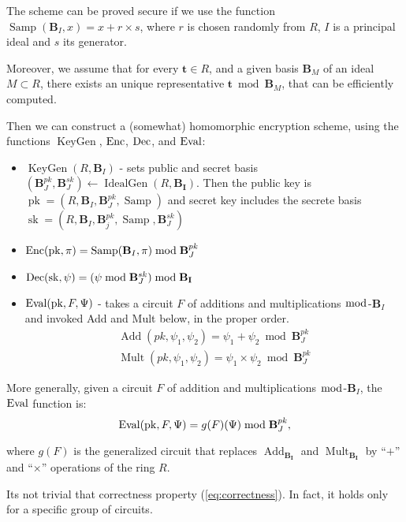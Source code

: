 The scheme can be proved secure if we use the function $\operatorname{Samp}(\mathbf B_I,x)=x+r\times s$, where $r$ is chosen randomly from $R$, $I$ is a principal ideal and $s$ its generator.

Moreover, we assume that for every $\mathbf t \in R$, and a given basis $\mathbf B_M$ of an ideal $M\subset R$, there exists an unique representative $\mathbf t \bmod {\mathbf B_M}$, that can be efficiently computed.

Then we can construct a (somewhat) homomorphic encryption scheme, using the functions $\operatorname{KeyGen}$, $\operatorname{Enc}$, $\operatorname{Dec}$, and $\operatorname{Eval}$:
\begin{itemize}
    \item $\operatorname{KeyGen}(R,\mathbf B_I)$ - sets public and secret basis $(\mathbf B_{J}^{pk},\mathbf B_{J}^{sk})\leftarrow \operatorname{IdealGen}(R,\mathbf{B_I})$. Then the public key is $\operatorname{pk}=(R,\mathbf B_I,\mathbf B_J^{pk},\operatorname{Samp})$ and secret key includes the secrete basis $\operatorname{sk}=(R,\mathbf B_I,\mathbf B_j^{pk},\operatorname{Samp},\mathbf B_J^{sk})$
    \item $\operatorname{Enc}(\operatorname{pk},\pi)=\operatorname{Samp}(\mathbf B_I,\pi)\bmod \mathbf B_J^{pk}$
    
    \item $\operatorname{Dec}(\operatorname{sk},\psi) = (\psi \bmod \mathbf B_J^{sk})\bmod \mathbf{B_I}$
    
    \item $\operatorname{Eval}(\operatorname{pk},F,\Psi)$ - takes a circuit $F$ of additions and multiplications $\bmod$-$ \mathbf B_I$ and invoked Add and Mult below, in the proper order.
    \begin{align*}
        \operatorname{Add}(pk,\psi_1,\psi_2)=\psi_1+\psi_2\bmod\mathbf B_J^{pk}\\
        \operatorname{Mult}(pk,\psi_1,\psi_2)=\psi_1\times\psi_2\bmod\mathbf B_J^{pk}
    \end{align*}
\end{itemize}

More generally, given a circuit $F$ of addition and multiplications  $\bmod$-$ \mathbf B_I$, the $\operatorname{Eval}$ function is:
$$\operatorname{Eval}(\operatorname{pk},F,\Psi)=g(F)(\Psi)\bmod\mathbf B_J^{pk},$$

where $g(F)$ is the generalized circuit that replaces $\operatorname{Add}_{\mathbf{B_I}}$ and $\operatorname{Mult}_{\mathbf{B_I}}$ by ``$+$'' and ``$\times$'' operations of the ring $R$.

Its not trivial that correctness property (\ref{eq:correctness}). In fact, it holds only for a specific group of circuits.

